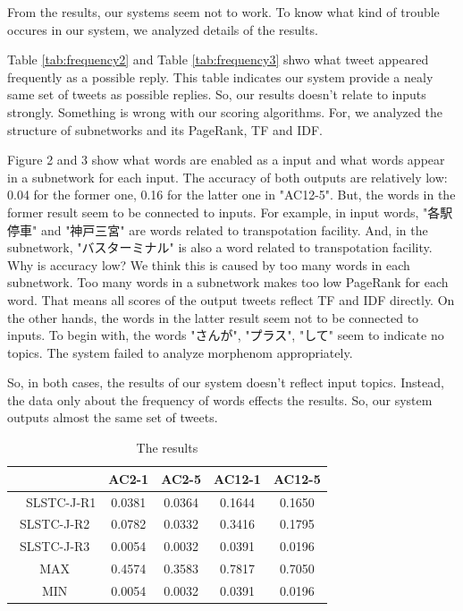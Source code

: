 \documentclass{../style/sig-alternate}
\begin{document}
From the results, our systems seem not to work. To know what kind of trouble occures in our system, we analyzed details of the results.


Table \ref{tab:frequency2} and Table \ref{tab:frequency3} shwo what tweet appeared frequently as a possible reply. This table indicates our system provide a nealy same set of tweets as possible replies. So, our results doesn't relate to inputs strongly. Something is wrong with our scoring algorithms. For, we analyzed the structure of subnetworks and its PageRank, TF and IDF.


Figure 2 and 3 show what words are enabled as a input and what words appear in a subnetwork for each input.
The accuracy of both outputs are relatively low: 0.04 for the former one, 0.16 for the latter one in "AC12-5". But, the words in the former result seem to be connected to inputs. For example, in input words, "各駅停車" and "神戸三宮" are words related to transpotation facility. And, in the subnetwork, "バスターミナル" is also a word related to transpotation facility. Why is accuracy low? We think this is caused by too many words in each subnetwork. Too many words in a subnetwork makes too low PageRank for each word. That means all scores of the output tweets reflect TF and IDF directly.
On the other hands, the words in the latter result seem not to be connected to inputs. To begin with, the words "さんが", "プラス", "して" seem to indicate no topics. The system failed to analyze morphenom appropriately.

So, in both cases, the results of our system doesn't reflect input topics. Instead, the data only about the frequency of words effects the results. So, our system outputs almost the same set of tweets.

\begin{table}[h!]
  \centering
  \caption{The results}
  \label{tab:results}
  \begin{tabular}{|c|c|c|c|c|} \hline
    　 & AC2-1 & AC2-5 & AC12-1 & AC12-5 \\ \hline
    　SLSTC-J-R1 & 0.0381 & 0.0364 & 0.1644 & 0.1650 \\ \hline
      SLSTC-J-R2 & 0.0782 & 0.0332 & 0.3416 & 0.1795\\ \hline
      SLSTC-J-R3 & 0.0054 & 0.0032 & 0.0391 & 0.0196\\ \hline
      MAX & 0.4574 & 0.3583 & 0.7817 & 0.7050\\ \hline
      MIN & 0.0054 & 0.0032 & 0.0391 & 0.0196\\ \hline
  \end{tabular}
\end{table}
\end{document}
